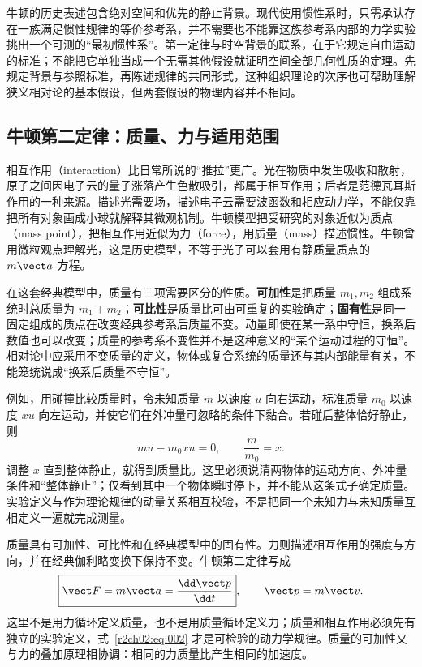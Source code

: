 牛顿的历史表述包含绝对空间和优先的静止背景。现代使用惯性系时，只需承认存在一族满足惯性规律的等价参考系，并不需要也不能靠这族参考系内部的力学实验挑出一个可测的“最初惯性系”。第一定律与时空背景的联系，在于它规定自由运动的标准；不能把它单独当成一个无需其他假设就证明空间全部几何性质的定理。先规定背景与参照标准，再陈述规律的共同形式，这种组织理论的次序也可帮助理解狭义相对论的基本假设，但两套假设的物理内容并不相同。

\subsection{牛顿第二定律：质量、力与适用范围}
\label{r2ch02:sec:newton-second}

相互作用（interaction）比日常所说的“推拉”更广。光在物质中发生吸收和散射，原子之间因电子云的量子涨落产生色散吸引，都属于相互作用；后者是范德瓦耳斯作用的一种来源。描述光需要场，描述电子云需要波函数和相应动力学，不能仅靠把所有对象画成小球就解释其微观机制。牛顿模型把受研究的对象近似为质点（mass point），把相互作用近似为力（force），用质量（mass）描述惯性。牛顿曾用微粒观点理解光，这是历史模型，不等于光子可以套用有静质量质点的 $m\vect a$ 方程。

在这套经典模型中，质量有三项需要区分的性质。\textbf{可加性}是把质量 $m_1,m_2$ 组成系统时总质量为 $m_1+m_2$；\textbf{可比性}是质量比可由可重复的实验确定；\textbf{固有性}是同一固定组成的质点在改变经典参考系后质量不变。动量即使在某一系中守恒，换系后数值也可以改变；质量的参考系不变性并不是这种意义的“某个运动过程的守恒”。相对论中应采用不变质量的定义，物体或复合系统的质量还与其内部能量有关，不能笼统说成“换系后质量不守恒”。

例如，用碰撞比较质量时，令未知质量 $m$ 以速度 $u$ 向右运动，标准质量 $m_0$ 以速度 $xu$ 向左运动，并使它们在外冲量可忽略的条件下黏合。若碰后整体恰好静止，则
\[
 mu-m_0xu=0,\qquad \frac{m}{m_0}=x.
\]
调整 $x$ 直到整体静止，就得到质量比。这里必须说清两物体的运动方向、外冲量条件和“整体静止”；仅看到其中一个物体瞬时停下，并不能从这条式子确定质量。实验定义与作为理论规律的动量关系相互校验，不是把同一个未知力与未知质量互相定义一遍就完成测量。

质量具有可加性、可比性和在经典模型中的固有性。力则描述相互作用的强度与方向，并在经典伽利略变换下保持不变。牛顿第二定律写成
\begin{equation}
 \boxed{\vect F=m\vect a=\frac{\dd\vect p}{\dd t}},
 \qquad \vect p=m\vect v .
 \label{r2ch02:eq:002}
\end{equation}
这里不是用力循环定义质量，也不是用质量循环定义力；质量和相互作用必须先有独立的实验定义，式~\eqref{r2ch02:eq:002} 才是可检验的动力学规律。质量的可加性又与力的叠加原理相协调：相同的力质量比产生相同的加速度。

